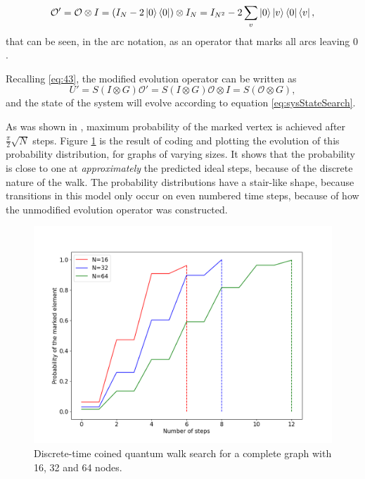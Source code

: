 \documentclass[../../dissertation.tex]{subfiles}
\begin{document}
\begin{equation}
	\mathcal{O'} =\mathcal{O}\otimes I = (I_N - 2\ket{0}\bra{0})\otimes I_N = I_{N^2} - 2 \sum_v \ket{0}\ket{v}\bra{0}\bra{v} ,
\end{equation}
that can be seen, in the arc notation, as an operator that marks all arcs leaving $0$.\par
Recalling \ref{eq:43}, the modified evolution operator can be written as
\begin{equation}
	U' = S(I \otimes G)\mathcal{O'} = S(I \otimes G)\mathcal{O} \otimes I = S (\mathcal{O} \otimes G),\label{eq:modifiedEvoCoined}
\end{equation}
and the state of the system will evolve according to equation \ref{eq:sysStateSearch}.\par
As was shown in \cite{REN1}, maximum probability of the marked vertex is achieved after $\frac{\pi}{2}\sqrt{N}$ steps. Figure \ref{fig:coinedSearch} is the result of coding and plotting the evolution of this probability distribution, for graphs of varying sizes. It shows that the probability is close to one at \textit{approximately} the predicted ideal steps, because of the discrete nature of the walk. The probability distributions have a stair-like shape, because transitions in this model only occur on even numbered time steps, because of how the unmodified evolution operator was constructed.

\begin{figure}[!h]
	\centering
	\includegraphics[scale=0.40]{img/CoinedQuantumWalk/Search/CoinedSearch163264.png}
	\caption{Discrete-time coined quantum walk search for a complete graph with 16, 32 and 64 nodes.}\label{fig:coinedSearch}
\end{figure}
\end{document}

